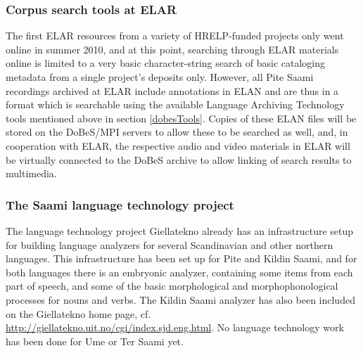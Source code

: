 \documentclass[a4paper,12pt]{article}
\begin{document}
\subsubsection{Corpus search tools at ELAR}%
The first ELAR resources from a variety of HRELP-funded projects only went online in summer 2010, and at this point, searching through ELAR materials online is limited to a very basic character-string search of basic cataloging metadata from a single project's deposits only. However, all Pite Saami recordings archived at ELAR include annotations in ELAN and are thus in a format which is searchable using the available Language Archiving Technology tools mentioned above in section \ref{dobesTools}. Copies of these ELAN files will be stored on the DoBeS/MPI servers to allow these to be searched as well, and, in cooperation with ELAR, the respective audio and video materials in ELAR will be virtually connected to the DoBeS archive to allow linking of search results to multimedia. %
%

\subsubsection{The Saami language technology project}

The language technology project Giellatekno already has an infrastructure setup for building language analyzers for several Scandinavian and other northern languages. This infrastructure has been set up for Pite and Kildin Saami, and for both languages there is an embryonic analyzer, containing some items from each part of speech, and some of the basic morphological and morphophonological processes for nouns and verbs. The Kildin Saami analyzer has also been included on the Giellatekno home page, cf. \url{http://giellatekno.uit.no/cgi/index.sjd.eng.html}.  No language technology work has been done for Ume or Ter Saami yet.
\end{document}
